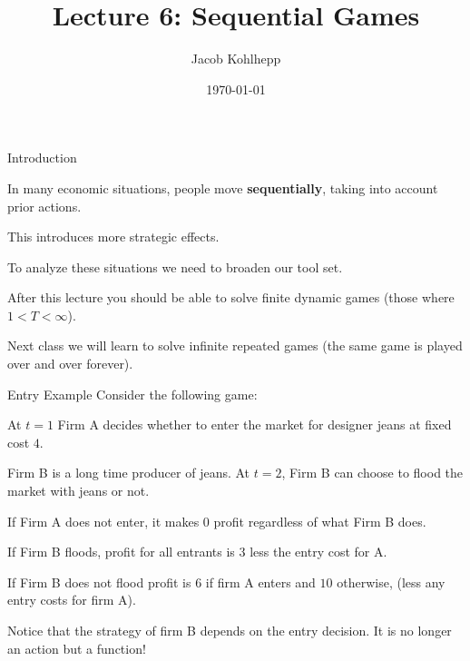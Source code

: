 \documentclass[aspectratio=169]{beamer}
\title[Spatial]{Lecture 6: Sequential Games} %
\author{Jacob Kohlhepp} %
\institute[UCLA] %
{
Econ 101 \\ %
\medskip
}
\date{\today} %
\newenvironment{wideitemize}{\itemize\addtolength{\itemsep}{10pt}}{\enditemize}
\begin{document}
\begin{frame}
\titlepage %
\end{frame}

\begin{frame}{Introduction}
\begin{wideitemize}
    \item In many economic situations, people move \textbf{sequentially}, taking into account prior actions.
    \item This introduces more strategic effects.
    \item To analyze these situations we need to broaden our tool set.
    \item After this lecture you should be able to solve finite dynamic games (those where $1<T<\infty$).
    \item Next class we will learn to solve infinite repeated games (the same game is played over and over forever).
\end{wideitemize}
\end{frame}

\begin{frame}{Entry Example}
Consider the following game:
\begin{wideitemize}
    \item At $t=1$ Firm A decides whether to enter the market for designer jeans at fixed cost $4$.
    \item Firm B is a long time producer of jeans. At $t=2$, Firm B can choose to flood the market with jeans or not.
    \item If Firm A does not enter, it makes 0 profit regardless of what Firm B does.
    \item If Firm B floods, profit for all entrants is $3$ less the entry cost for A. 
    
    \item If Firm B does not flood profit is $6$ if firm A enters and $10$ otherwise, (less any entry costs for firm A).
    \item Notice that the strategy of firm B depends on the entry decision. It is no longer an action but a function!
\end{wideitemize}
    
\end{frame}
\end{document}
